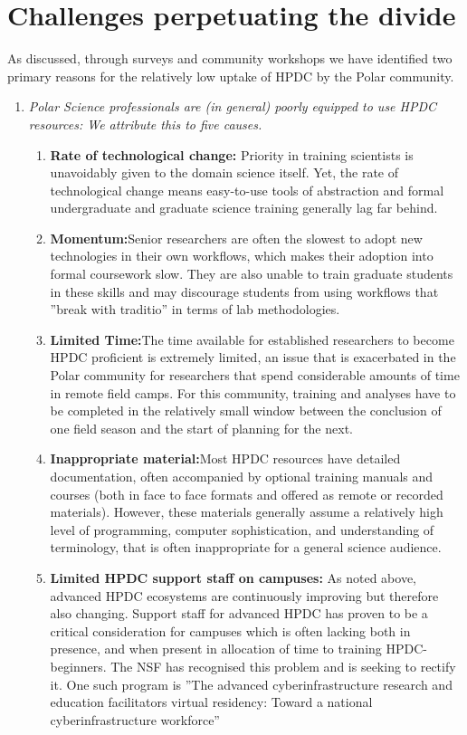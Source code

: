 \documentclass[conference]{IEEEtran}
\begin{document}
\section{Challenges perpetuating the divide}
As discussed, through surveys and community workshops we have identified two primary reasons for the relatively low uptake of HPDC by the Polar community.  

\begin{enumerate}
\item \textit{Polar Science professionals are (in general) poorly equipped to use HPDC resources:
We attribute this to five causes.}
\begin{enumerate}
\item \textbf{Rate of technological change:} Priority in training scientists is unavoidably given to the domain science itself. Yet, the rate of technological change means easy-to-use tools of abstraction and formal undergraduate and graduate science training generally lag far behind. 
\item \textbf{Momentum:}Senior researchers are often the slowest to adopt new technologies in their own workflows, which makes their adoption into formal coursework slow. They are also unable to train graduate students in these skills and may discourage students from using workflows that ''break with traditio'' in terms of lab methodologies.
\item \textbf{Limited Time:}The time available for established researchers to become HPDC proficient is extremely limited, an issue that is exacerbated in the Polar community for researchers that spend considerable amounts of time in remote field camps. For this community, training and analyses have to be completed in the relatively small window between the conclusion of one field season and the start of planning for the next. 
\item \textbf{Inappropriate material:}Most HPDC resources have detailed documentation, often accompanied by optional training manuals and courses (both in face to face formats and offered as remote or recorded materials). However, these materials generally assume a relatively high level of programming, computer sophistication, and understanding of terminology, that is often inappropriate for a general science audience.  
\item \textbf{Limited HPDC support staff on campuses:} As noted above, advanced HPDC ecosystems are continuously improving but therefore also changing. Support staff for advanced HPDC has proven to be a critical consideration for campuses which is often lacking both in presence, and when present in allocation of time to training HPDC-beginners. The NSF has recognised this problem and is seeking to rectify it.  One such program is ''The advanced cyberinfrastructure research and education facilitators virtual residency: Toward a national cyberinfrastructure workforce''\cite{Neeman2016-uz}

\end{enumerate}
\end{enumerate}
\end{document}
